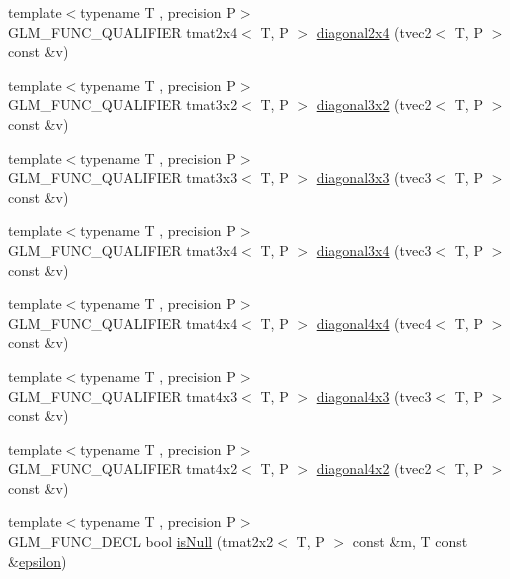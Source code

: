 \begin{DoxyCompactItemize}
\item 
{\footnotesize template$<$typename T , precision P$>$ }\\G\+L\+M\+\_\+\+F\+U\+N\+C\+\_\+\+Q\+U\+A\+L\+I\+F\+I\+E\+R tmat2x4$<$ T, P $>$ \hyperlink{group__gtx__matrix__operation_ga49b37c819cf6dd8e35112ed1a13d45a3}{diagonal2x4} (tvec2$<$ T, P $>$ const \&v)
\item 
{\footnotesize template$<$typename T , precision P$>$ }\\G\+L\+M\+\_\+\+F\+U\+N\+C\+\_\+\+Q\+U\+A\+L\+I\+F\+I\+E\+R tmat3x2$<$ T, P $>$ \hyperlink{group__gtx__matrix__operation_ga586e1ced91fd8a7c414186a200f13532}{diagonal3x2} (tvec2$<$ T, P $>$ const \&v)
\item 
{\footnotesize template$<$typename T , precision P$>$ }\\G\+L\+M\+\_\+\+F\+U\+N\+C\+\_\+\+Q\+U\+A\+L\+I\+F\+I\+E\+R tmat3x3$<$ T, P $>$ \hyperlink{group__gtx__matrix__operation_ga8e817dba22f2305cdebae07bbbe0360c}{diagonal3x3} (tvec3$<$ T, P $>$ const \&v)
\item 
{\footnotesize template$<$typename T , precision P$>$ }\\G\+L\+M\+\_\+\+F\+U\+N\+C\+\_\+\+Q\+U\+A\+L\+I\+F\+I\+E\+R tmat3x4$<$ T, P $>$ \hyperlink{group__gtx__matrix__operation_gae3f85af86c18c80f2acbe3223feb8e81}{diagonal3x4} (tvec3$<$ T, P $>$ const \&v)
\item 
{\footnotesize template$<$typename T , precision P$>$ }\\G\+L\+M\+\_\+\+F\+U\+N\+C\+\_\+\+Q\+U\+A\+L\+I\+F\+I\+E\+R tmat4x4$<$ T, P $>$ \hyperlink{group__gtx__matrix__operation_gade576e044d8e52f343166f665589d782}{diagonal4x4} (tvec4$<$ T, P $>$ const \&v)
\item 
{\footnotesize template$<$typename T , precision P$>$ }\\G\+L\+M\+\_\+\+F\+U\+N\+C\+\_\+\+Q\+U\+A\+L\+I\+F\+I\+E\+R tmat4x3$<$ T, P $>$ \hyperlink{group__gtx__matrix__operation_ga4242ea5681f81539e0c5b54fadcd9ddf}{diagonal4x3} (tvec3$<$ T, P $>$ const \&v)
\item 
{\footnotesize template$<$typename T , precision P$>$ }\\G\+L\+M\+\_\+\+F\+U\+N\+C\+\_\+\+Q\+U\+A\+L\+I\+F\+I\+E\+R tmat4x2$<$ T, P $>$ \hyperlink{group__gtx__matrix__operation_ga70cc5632aa9f41e7cf0b81fee6f2bfe6}{diagonal4x2} (tvec2$<$ T, P $>$ const \&v)
\item 
{\footnotesize template$<$typename T , precision P$>$ }\\G\+L\+M\+\_\+\+F\+U\+N\+C\+\_\+\+D\+E\+C\+L bool \hyperlink{group__gtx__matrix__query_ga37e535cbeaea383b8c1247b98875cd4b}{is\+Null} (tmat2x2$<$ T, P $>$ const \&m, T const \&\hyperlink{group__gtc__constants_ga2a1e57fc5592b69cfae84174cbfc9429}{epsilon})

\end{DoxyCompactItemize}
